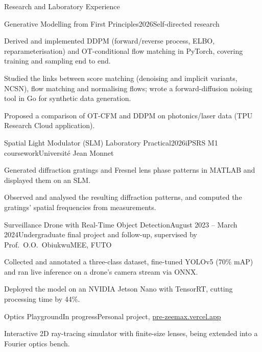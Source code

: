 \documentclass{resume}
\begin{document}
\begin{rSection}{Research and Laboratory Experience}

\begin{rSubsection}{Generative Modelling from First Principles}{2026}{Self-directed research}{}
\item Derived and implemented DDPM (forward/reverse process, ELBO, reparameterisation) and OT-conditional flow matching in PyTorch, covering training and sampling end to end.
\item Studied the links between score matching (denoising and implicit variants, NCSN), flow matching and normalising flows; wrote a forward-diffusion noising tool in Go for synthetic data generation.
\item Proposed a comparison of OT-CFM and DDPM on photonics/laser data (TPU Research Cloud application).
\end{rSubsection}

\begin{rSubsection}{Spatial Light Modulator (SLM) Laboratory Practical}{2026}{iPSRS M1 coursework}{Université Jean Monnet}
\item Generated diffraction gratings and Fresnel lens phase patterns in MATLAB and displayed them on an SLM.
\item Observed and analysed the resulting diffraction patterns, and computed the gratings' spatial frequencies from measurements.
\end{rSubsection}

\begin{rSubsection}{Surveillance Drone with Real-Time Object Detection}{August 2023 -- March 2024}{Undergraduate final project and follow-up, supervised by Prof.\ O.O.\ Obiukwu}{MEE, FUTO}
\item Collected and annotated a three-class dataset, fine-tuned YOLOv5 (70\% mAP) and ran live inference on a drone's camera stream via ONNX.
\item Deployed the model on an NVIDIA Jetson Nano with TensorRT, cutting processing time by 44\%.
\end{rSubsection}

\begin{rSubsection}{Optics Playground}{In progress}{Personal project, \href{https://pre-zeemax.vercel.app/}{pre-zeemax.vercel.app}}{}
\item Interactive 2D ray-tracing simulator with finite-size lenses, being extended into a Fourier optics bench.
\end{rSubsection}

\end{rSection}
\end{document}
